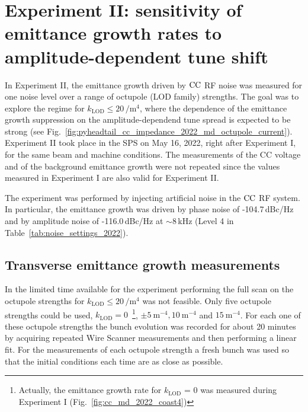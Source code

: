 \section{Experiment II: sensitivity of emittance growth rates to amplitude-dependent tune shift}\label{subsec:cc_md_2022_octupole_scan}

In Experiment II, the emittance growth driven by ${\mathrm{CC}}$ RF noise was measured for one noise level over a range of octupole (LOD family) strengths. The goal was to explore the regime for $k_\mathrm{LOD} \leq 20$\,$\mathrm{/m^4}$, where the dependence of the emittance growth suppression on the amplitude-dependend tune spread is expected to be strong (see Fig.~\ref{fig:pyheadtail_cc_impedance_2022_md_octupole_current}). Experiment II took place in the SPS on May 16, 2022, right after Experiment I, for the same beam and machine conditions. The measurements of the CC voltage and of the background emittance growth were not repeated since the values measured in Experiment I are also valid for Experiment II.

The experiment was performed by injecting artificial noise in the ${\mathrm{CC}}$ RF system. In particular, the emittance growth was driven by phase noise of -104.7\,dBc/Hz and by amplitude noise of -116.0\,dBc/Hz at $\sim$8\,kHz (Level 4 in Table~\ref{tab:noise_settings_2022}). 


\subsection{Transverse emittance growth measurements}\label{subsec:emit_growth_exp2}

In the limited time available for the experiment performing the full scan on the octupole strengths for $k_\mathrm{LOD} \leq 20$\,$\mathrm{/m^4}$ was not feasible. Only five octupole strengths could be used, $k_\mathrm{LOD} = 0$~\footnote{Actually, the emittance growth rate for $k_\mathrm{LOD}$ = 0 was measured during Experiment I (Fig.~\ref{fig:cc_md_2022_coast4})}, $\pm 5 \ \mathrm{m^{-4}}, 10 \ \mathrm{m^{-4}}$ and $15 \ \mathrm{m^{-4}}$. %
For each one of these octupole strengths the bunch evolution was recorded for about 20 minutes by acquiring repeated Wire Scanner measurements and then performing a linear fit. For the measurements of each octupole strength a fresh bunch was used so that the initial conditions each time are as close as possible.


